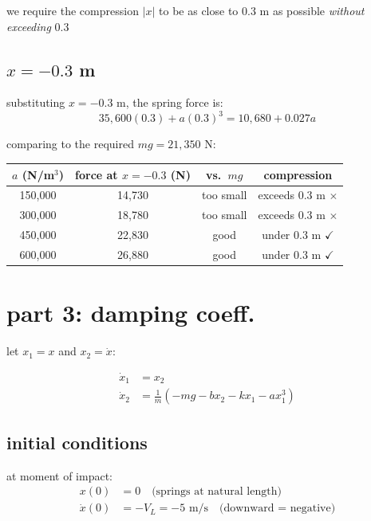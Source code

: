 \documentclass[12pt]{article}
\begin{document}
we require the compression $|x|$ to be as close to $0.3$ m as possible \textit{without exceeding} $0.3$ 

\subsection{$x = -0.3$ m}

substituting $x = -0.3$ m, the spring force is:
\[
    35{,}600(0.3) + a(0.3)^3 = 10{,}680 + 0.027a
\]

comparing to the required $mg = 21{,}350$ N:

\begin{center}
\begin{tabular}{cccc}
\toprule
$a$ (N/m$^3$) & force at $x=-0.3$ (N) & vs.\ $mg$ & compression \\
\midrule
150,000 & 14,730 & too small & exceeds 0.3 m $\times$ \\
300,000 & 18,780 & too small & exceeds 0.3 m $\times$ \\
450,000 & 22,830 & good & under 0.3 m $\checkmark$ \\
600,000 & 26,880 & good & under 0.3 m $\checkmark$ \\
\bottomrule
\end{tabular}
\end{center}

\section{part 3: damping coeff.}

let $x_1 = x$ and $x_2 = \dot{x}$:

\begin{align*}
    \dot{x}_1 &= x_2 \\
    \dot{x}_2 &= \frac{1}{m}\left(-mg - bx_2 - kx_1 - ax_1^3\right)
\end{align*}

\subsection{initial conditions}

at moment of impact:
\begin{align*}
    x(0) &= 0 \quad \text{(springs at natural length)} \\
    \dot{x}(0) &= -V_L = -5 \text{ m/s} \quad \text{(downward = negative)}
\end{align*}
\end{document}
